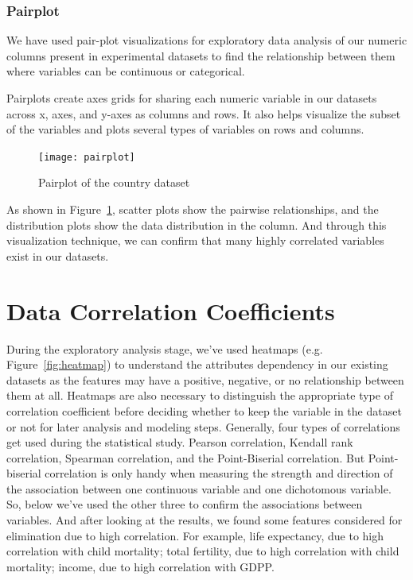 \documentclass{swfuthesise}
\begin{document}
\subsubsection{Pairplot}

We have used pair-plot visualizations for exploratory data analysis of our numeric columns present in experimental datasets to find the relationship between them where variables can be continuous or categorical. 

Pairplots create axes grids for sharing each numeric variable in our datasets across x, axes, and y-axes as columns and rows. It also helps visualize the subset of the variables and plots several types of variables on rows and columns.

\begin{figure}[!htp]
  \centering \texttt{[image: pairplot]}
  \caption{Pairplot of the country dataset\label{fig:pairplot}}  
\end{figure}
  
As shown in Figure~\ref{fig:pairplot}, scatter plots show the pairwise relationships, and the distribution plots show the data distribution in the column. And through this visualization technique, we can confirm that many highly correlated variables exist in our datasets.

\section{Data Correlation Coefficients}
\label{sec:dcc}

During the exploratory analysis stage, we've used heatmaps (e.g. Figure~\ref{fig:heatmap})
to understand the attributes dependency in our existing datasets as the features may have
a positive, negative, or no relationship between them at all. Heatmaps are also necessary to
distinguish the appropriate type of correlation coefficient before deciding whether to
keep the variable in the dataset or not for later analysis and modeling steps. Generally,
four types of correlations get used during the statistical study. Pearson correlation,
Kendall rank correlation, Spearman correlation, and the Point-Biserial correlation. But
Point-biserial correlation is only handy when measuring the strength and direction of the
association between one continuous variable and one dichotomous variable. So, below we've
used the other three to confirm the associations between variables. And after looking at
the results, we found some features considered for elimination due to high
correlation. For example, life expectancy, due to high correlation with child mortality;
total fertility, due to high correlation with child mortality; income, due to high
correlation with GDPP.
\end{document}

